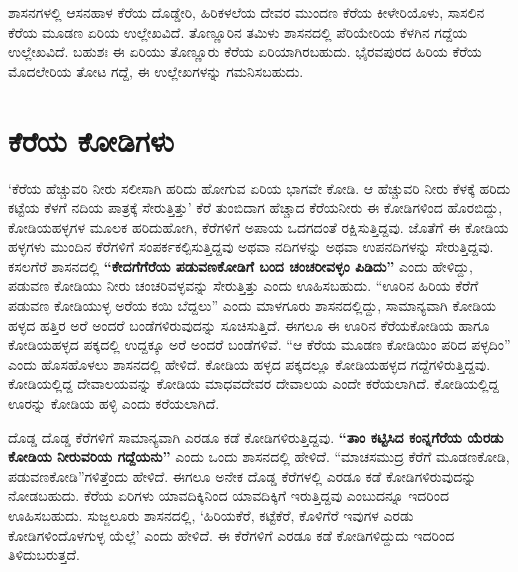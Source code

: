 ಶಾಸನಗಳಲ್ಲಿ ಆಸನಹಾಳ ಕೆರೆಯ ದೊಡ್ಡೇರಿ, ಹಿರಿಕಳಲೆಯ ದೇವರ ಮುಂದಣ ಕೆರೆಯ ಕೀಳೇರಿಯೊಳು, ಸಾಸಲಿನ ಕೆರೆಯ ಮೂಡಣ ಏರಿಯ ಉಲ್ಲೇಖವಿದೆ. ತೊಣ್ಣೂರಿನ ತಮಿಳು ಶಾಸನದಲ್ಲಿ ಪೆರಿಯೇರಿಯ ಕೆಳಗಿನ ಗದ್ದೆಯ ಉಲ್ಲೇಖವಿದೆ. ಬಹುಶಃ ಈ ಏರಿಯು ತೊಣ್ಣೂರು ಕೆರೆಯ ಏರಿಯಾಗಿರಬಹುದು. ಭೈರವಪುರದ ಹಿರಿಯ ಕೆರೆಯ ಮೊದಲೇರಿಯ ತೋಟ ಗದ್ದೆ, ಈ ಉಲ್ಲೇಖಗಳನ್ನು ಗಮನಿಸಬಹುದು.

\section*{ಕೆರೆಯ ಕೋಡಿಗಳು}

‘ಕೆರೆಯ ಹೆಚ್ಚುವರಿ ನೀರು ಸಲೀಸಾಗಿ ಹರಿದು ಹೋಗುವ ಏರಿಯ ಭಾಗವೇ ಕೋಡಿ. ಆ ಹೆಚ್ಚುವರಿ ನೀರು ಕೆಳಕ್ಕೆ ಹರಿದು ಕಟ್ಟೆಯ ಕೆಳಗೆ ನದಿಯ ಪಾತ್ರಕ್ಕೆ ಸೇರುತ್ತಿತ್ತು’ ಕೆರೆ ತುಂಬಿದಾಗ ಹೆಚ್ಚಾದ ಕೆರೆಯನೀರು ಈ ಕೋಡಿಗಳಿಂದ ಹೊರಬಿದ್ದು, ಕೋಡಿಯಹಳ್ಳಗಳ ಮೂಲಕ ಹರಿದುಹೋಗಿ, ಕೆರೆಗಳಿಗೆ ಅಪಾಯ ಒದಗದಂತೆ ರಕ್ಷಿಸುತ್ತಿದ್ದವು. ಜೊತೆಗೆ ಈ ಕೋಡಿಯ ಹಳ್ಳಗಳು ಮುಂದಿನ ಕೆರೆಗಳಿಗೆ ಸಂಪರ್ಕಕಲ್ಪಿಸುತ್ತಿದ್ದವು ಅಥವಾ ನದಿಗಳನ್ನು ಅಥವಾ ಉಪನದಿಗಳನ್ನು ಸೇರುತ್ತಿದ್ದವು. ಕಸಲಗೆರೆ ಶಾಸನದಲ್ಲಿ \textbf{“ಕೇದಗೆಗೆರೆಯ ಪಡುವಣಕೋಡಿಗೆ ಬಂದ ಚಂಚರೀವಳ್ಳಂ ಪಿಡಿದು”} ಎಂದು ಹೇಳಿದ್ದು, ಪಡುವಣ ಕೋಡಿಯು ನೀರು ಚಂಚರಿವಳ್ಳವನ್ನು ಸೇರುತ್ತಿತ್ತು ಎಂದು ಊಹಿಸಬಹುದು. “ಊರಿನ ಹಿರಿಯ ಕೆರೆಗೆ ಪಡುವಣ ಕೋಡಿಯುಳ್ಳ ಅರೆಯ ಕಯಿ ಬೆದ್ದಲು” ಎಂದು ಮಾಳಗೂರು ಶಾಸನದಲ್ಲಿದ್ದು, ಸಾಮಾನ್ಯವಾಗಿ ಕೋಡಿಯ ಹಳ್ಳದ ಹತ್ತಿರ ಅರೆ ಅಂದರೆ ಬಂಡೆಗಳಿರುವುದನ್ನು ಸೂಚಿಸುತ್ತಿದೆ. ಈಗಲೂ ಈ ಊರಿನ ಕೆರೆಯಕೋಡಿಯ ಹಾಗೂ ಕೋಡಿಯಹಳ್ಳದ ಪಕ್ಕದಲ್ಲಿ ಉದ್ದಕ್ಕೂ ಅರೆ ಅಂದರೆ ಬಂಡೆಗಳಿವೆ. “ಆ ಕೆರೆಯ ಮೂಡಣ ಕೋಡಿಯಿಂ ಪರಿದ ಪಳ್ಳದಿಂ” ಎಂದು ಹೊಸಹೊಳಲು ಶಾಸನದಲ್ಲಿ ಹೇಳಿದೆ. ಕೋಡಿಯ ಹಳ್ಳದ ಪಕ್ಕದಲ್ಲೂ ಕೋಡಿಯಹಳ್ಳದ ಗದ್ದೆಗಳಿರುತ್ತಿದ್ದವು. ಕೋಡಿಯಲ್ಲಿದ್ದ ದೇವಾಲಯವನ್ನು ಕೋಡಿಯ ಮಾಧವದೇವರ ದೇವಾಲಯ ಎಂದೇ ಕರೆಯಲಾಗಿದೆ. ಕೋಡಿಯಲ್ಲಿದ್ದ ಊರನ್ನು ಕೋಡಿಯ ಹಳ್ಳಿ ಎಂದು ಕರೆಯಲಾಗಿದೆ.

ದೊಡ್ಡ ದೊಡ್ಡ ಕೆರೆಗಳಿಗೆ ಸಾಮಾನ್ಯವಾಗಿ ಎರಡೂ ಕಡೆ ಕೋಡಿಗಳಿರುತ್ತಿದ್ದವು. \textbf{“ತಾಂ ಕಟ್ಟಿಸಿದ ಕಂನ್ನಗೆರೆಯ ಯೆರಡು ಕೋಡಿಯ ನೀರುವರಿಯ ಗದ್ದೆಯನು”} ಎಂದು ಒಂದು ಶಾಸನದಲ್ಲಿ ಹೇಳಿದೆ. “ಮಾಚಸಮುದ್ರ ಕೆರೆಗೆ ಮೂಡಣಕೋಡಿ, ಪಡುವಣಕೋಡಿ”ಗಳಿತ್ತೆಂದು ಹೇಳಿದೆ. ಈಗಲೂ ಅನೇಕ ದೊಡ್ಡ ಕೆರೆಗಳಲ್ಲಿ ಎರಡೂ ಕಡೆ ಕೋಡಿಗಳಿರುವುದನ್ನು ನೋಡಬಹುದು. ಕೆರೆಯ ಏರಿಗಳು ಯಾವದಿಕ್ಕಿನಿಂದ ಯಾವದಿಕ್ಕಿಗೆ ಇರುತ್ತಿದ್ದವು ಎಂಬುದನ್ನೂ ಇದರಿಂದ ಊಹಿಸಬಹುದು. ಸುಜ್ಜಲೂರು ಶಾಸನದಲ್ಲಿ, ‘ಹಿರಿಯಕೆರೆ, ಕಟ್ಟೆಕೆರೆ, ಕೊಳಿಗೆರೆ ಇವುಗಳ ಎರಡು ಕೋಡಿಗಳಿಂದೊಳಗುಳ್ಳ ಯೆಲ್ಲೆ’ ಎಂದು ಹೇಳಿದೆ. ಈ ಕೆರೆಗಳಿಗೆ ಎರಡೂ ಕಡೆ ಕೋಡಿಗಳಿದ್ದುದು ಇದರಿಂದ ತಿಳಿದುಬರುತ್ತದೆ.

